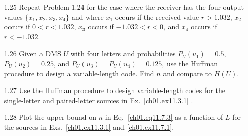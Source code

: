 \begin{itemize}
\item[1.25]
Repeat Problem 1.24 for the case where the receiver has the four
output values $\{ x_1, x_2, x_3, x_4 \}$ and where $x_1$ occurs
if the received value $r> 1.032$,
$x_2$ occurs if $0 < r < 1.032$,
$x_3$ occurs if $- 1.032 < r < 0$, and
$x_4$ occurs if $  r < - 1.032$.

\item[1.26]
Given a DMS $U$ with four letters and probabilities $P_U(u_1)=0.5$,
$P_U (u_2) = 0.25$, and  $P_U (u_3) = P_U (u_4)= 0.125$,
use the Huffman procedure to design a variable-length code.
Find $\bar{n}$ and compare to $H(U)$.

\item[1.27]
Use the Huffman procedure to design variable-length codes
for the single-letter and paired-letter sources in
Ex.~\ref{ch01.ex11.3.1} .

\item[1.28]
Plot the upper bound on $\bar{n}$ in Eq.~\eqref{ch01.eq11.7.3}
as a function of $L$ for the sources in Exs.~\ref{ch01.ex11.3.1}
and \ref{ch01.ex11.7.1}.
\end{itemize}

